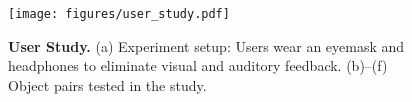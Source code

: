 \begin{figure}[ht]
  \vspace{-3mm}
  \centering
  \texttt{[image: figures/user\_study.pdf]}
  \caption{
  \textbf{User Study.} (a) Experiment setup: Users wear an eyemask and headphones to eliminate visual and auditory feedback. (b)–(f) Object pairs tested in the study.
  }
  \label{fig:user_study}
  \vspace{-3mm}
\end{figure}